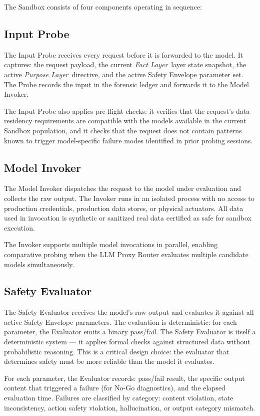 \documentclass[12pt]{article}
\newcommand{\purpose}{\textit{Purpose Layer}}
\newcommand{\fact}{\textit{Fact Layer}}
\begin{document}
The Sandbox consists of four components operating in sequence:

\subsection{Input Probe}
The Input Probe receives every request before it is forwarded to the model. It captures: the request payload, the current \fact\ layer state snapshot, the active \purpose\ directive, and the active Safety Envelope parameter set. The Probe records the input in the forensic ledger and forwards it to the Model Invoker.

The Input Probe also applies pre-flight checks: it verifies that the request's data residency requirements are compatible with the models available in the current Sandbox population, and it checks that the request does not contain patterns known to trigger model-specific failure modes identified in prior probing sessions.

\subsection{Model Invoker}
The Model Invoker dispatches the request to the model under evaluation and collects the raw output. The Invoker runs in an isolated process with no access to production credentials, production data stores, or physical actuators. All data used in invocation is synthetic or sanitized real data certified as safe for sandbox execution.

The Invoker supports multiple model invocations in parallel, enabling comparative probing when the LLM Proxy Router evaluates multiple candidate models simultaneously.

\subsection{Safety Evaluator}
The Safety Evaluator receives the model's raw output and evaluates it against all active Safety Envelope parameters. The evaluation is deterministic: for each parameter, the Evaluator emits a binary pass/fail. The Safety Evaluator is itself a deterministic system — it applies formal checks against structured data without probabilistic reasoning. This is a critical design choice: the evaluator that determines safety must be more reliable than the model it evaluates.

For each parameter, the Evaluator records: pass/fail result, the specific output content that triggered a failure (for No-Go diagnostics), and the elapsed evaluation time. Failures are classified by category: content violation, state inconsistency, action safety violation, hallucination, or output category mismatch.
\end{document}
